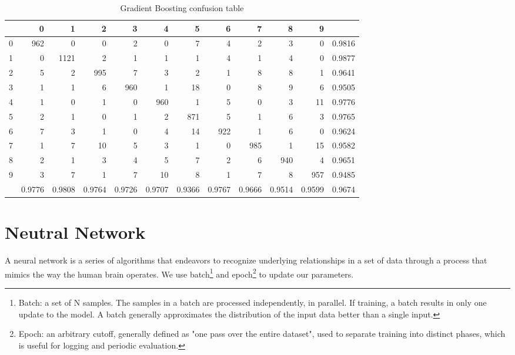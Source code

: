 \documentclass[conference]{IEEEtran}
\begin{document}
\begin{table}[htbp]
\tiny
  \centering
  \caption{Gradient Boosting confusion table}
\begin{tabular}{|r|rrrrrrrrrr|r|}
\hline
  & 0 & 1 & 2 & 3 & 4 & 5 & 6 & 7 & 8 & 9 &  \\
\hline
0 & 962 & 0 & 0 & 2 & 0 & 7 & 4 & 2 & 3 & 0 & 0.9816 \\
1 & 0 & 1121 & 2 & 1 & 1 & 1 & 4 & 1 & 4 & 0 & 0.9877 \\
2 & 5 & 2 & 995 & 7 & 3 & 2 & 1 & 8 & 8 & 1 & 0.9641 \\
3 & 1 & 1 & 6 & 960 & 1 & 18 & 0 & 8 & 9 & 6 & 0.9505 \\
4 & 1 & 0 & 1 & 0 & 960 & 1 & 5 & 0 & 3 & 11 & 0.9776 \\
5 & 2 & 1 & 0 & 1 & 2 & 871 & 5 & 1 & 6 & 3 & 0.9765 \\
6 & 7 & 3 & 1 & 0 & 4 & 14 & 922 & 1 & 6 & 0 & 0.9624 \\
7 & 1 & 7 & 10 & 5 & 3 & 1 & 0 & 985 & 1 & 15 & 0.9582 \\
8 & 2 & 1 & 3 & 4 & 5 & 7 & 2 & 6 & 940 & 4 & 0.9651 \\
9 & 3 & 7 & 1 & 7 & 10 & 8 & 1 & 7 & 8 & 957 & 0.9485 \\
\hline
  & 0.9776 & 0.9808 & 0.9764 & 0.9726 & 0.9707 & 0.9366 & 0.9767 & 0.9666 & 0.9514 & 0.9599 & 0.9674 \\
\hline
\end{tabular}%
 \label{tab:Gradient Boosting confusion table}%
\end{table}%






\section{Neutral Network}\label{nn}
A neural network is a series of algorithms that endeavors to recognize underlying relationships in a set of data through a process that mimics the way the human brain operates.
We use batch\footnote{Batch: a set of N samples. The samples in a batch are processed independently, in parallel. If training, a batch results in only one update to the model.
A batch generally approximates the distribution of the input data better than a single input.} and epoch\footnote{Epoch: an arbitrary cutoff, generally defined as "one pass over the entire dataset", used to separate training into distinct phases, which is useful for logging and periodic evaluation.} to update our parameters\cite{chollet2015keras}.
\end{document}
